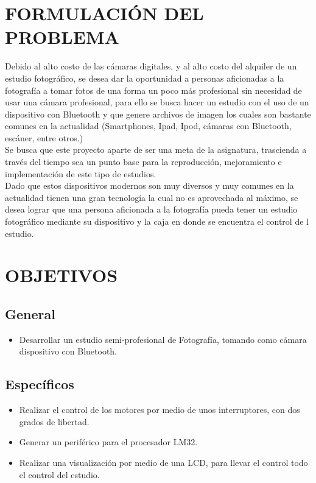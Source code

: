 \documentclass[10pt,graphicx,caption,rotating]{article}
\begin{document}
\section{FORMULACIÓN DEL PROBLEMA}
\noindent
Debido al alto costo de las cámaras digitales, y al alto costo del alquiler de un estudio fotográfico, se desea dar la oportunidad a personas aficionadas a la fotografía a tomar fotos de una forma un poco más profesional sin necesidad de usar una cámara profesional, para ello se busca hacer un estudio con el uso de un dispositivo con Bluetooth y que genere archivos de imagen los cuales son bastante comunes en la actualidad (Smartphones, Ipad, Ipod, cámaras con Bluetooth, escáner, entre otros.)\\
Se busca que este proyecto aparte de ser una meta de la asignatura, trascienda a través del tiempo sea un punto base para la reproducción, mejoramiento e implementación de este tipo de estudios.\\
Dado que estos dispositivos modernos son muy diversos y muy comunes en la actualidad tienen una gran tecnología la cual no es aprovechada al máximo, se desea lograr que una persona aficionada a la fotografía pueda tener un estudio fotográfico mediante su dispositivo y la caja en donde se encuentra el control de l estudio.

\section{OBJETIVOS}
\subsection{General}
\begin{itemize}
 \item Desarrollar un estudio semi-profesional de Fotografía, tomando como cámara dispositivo con Bluetooth.
\end{itemize}

\subsection{Específicos}
\begin{itemize}
 \item Realizar el control de los motores por medio de unos interruptores, con dos grados de libertad.
 \item Generar un periférico para el procesador LM32.
 \item Realizar una visualización por medio de una LCD, para llevar el control todo el control del estudio.
\end{itemize}
\end{document}
